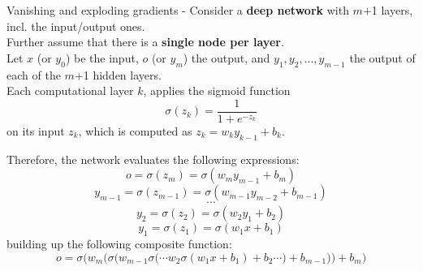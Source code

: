 \begin{frame}[t,allowframebreaks]{
    Vanishing and exploding gradients -}
    Consider a {\bf deep network} with $m$+1 layers, 
    incl. the input/output ones.\\
    Further assume that there is a {\bf single node per layer}.\\
    \vspace{0.2cm}
    Let $x$ (or $y_0$) be the input, $o$ (or $y_m$) the output, and
    $y_{1}, y_{2},...,y_{m-1}$ the output of each of the $m$+1 hidden layers.\\
    \vspace{0.2cm}
    Each computational layer $k$, applies the sigmoid function
    \begin{equation}
        \sigma(z_{k}) = \frac{1}{1+e^{-z_{k}}}
     \end{equation} 
    on its input $z_k$, which is computed as $z_k = w_{k}y_{k-1}+b_{k}$.

    

    \framebreak


    \vspace{-1.0cm}

    Therefore, the network evaluates the following expressions:
    \begin{equation}
       o = \sigma(z_m) = \sigma(w_{m} y_{m-1} + b_{m}) 
    \end{equation}
    \begin{equation}
        y_{m-1} = \sigma(z_{m-1}) = \sigma(w_{m-1} y_{m-2} + b_{m-1}) 
     \end{equation}
     \begin{equation*}
        \cdots
     \end{equation*}
     \begin{equation}
        y_{2} = \sigma(z_{2}) = \sigma(w_{2} y_{1} + b_{2}) 
     \end{equation}
     \begin{equation}
        y_{1} = \sigma(z_{1}) = \sigma(w_{1} x + b_{1}) 
     \end{equation}
     building up the following composite function:
     \begin{equation}
        o = \sigma\Bigg( 
               w_{m} \bigg( 
                  \sigma\Big(
                     w_{m-1} \sigma\big(
                     \cdots
                     w_{2}\sigma(w_{1} x + b_{1})+b_{2}
                     \cdots \big) + b_{m-1}
                  \Big) 
               \bigg) + b_{m} 
            \Bigg) 
     \end{equation}
  

\end{frame}
